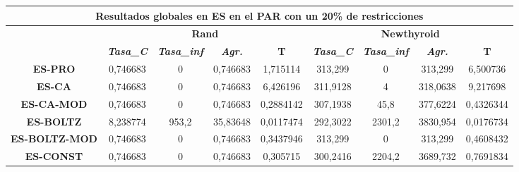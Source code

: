 \documentclass[12pt, spanish]{article}
\begin{document}
\begin{table}[H]
\hspace*{-1.2cm}\begin{tabular}{|c|c|c|c|c|c|c|c|c|}
\hline
\multicolumn{9}{|c|}{\textbf{Resultados globales en ES en el PAR con un 20\% de restricciones}}                                                                                                                                         \\ \hline
\multicolumn{1}{|l|}{\multirow{2}{*}{}} & \multicolumn{4}{c|}{\textbf{Rand}}                                                            & \multicolumn{4}{c|}{\textbf{Newthyroid}}                                                      \\ \cline{2-9} 
\multicolumn{1}{|l|}{}                  & \textit{\textbf{Tasa\_C}} & \textit{\textbf{Tasa\_inf}} & \textit{\textbf{Agr.}} & \textbf{T} & \textit{\textbf{Tasa\_C}} & \textit{\textbf{Tasa\_inf}} & \textit{\textbf{Agr.}} & \textbf{T} \\ \hline
\textbf{ES-PRO}                         & 0,746683                  & 0                           & 0,746683               & 1,715114   & 313,299                   & 0                           & 313,299                & 6,500736   \\ \hline
\textbf{ES-CA}                          & 0,746683                  & 0                           & 0,746683               & 6,426196   & 311,9128                  & 4                           & 318,0638               & 9,217698   \\ \hline
\textbf{ES-CA-MOD}                      & 0,746683                  & 0                           & 0,746683               & 0,2884142  & 307,1938                  & 45,8                        & 377,6224               & 0,4326344  \\ \hline
\textbf{ES-BOLTZ}                       & 8,238774                  & 953,2                       & 35,83648               & 0,0117474  & 292,3022                  & 2301,2                      & 3830,954               & 0,0176734  \\ \hline
\textbf{ES-BOLTZ-MOD}                   & 0,746683                  & 0                           & 0,746683               & 0,3437946  & 313,299                   & 0                           & 313,299                & 0,4608432  \\ \hline
\textbf{ES-CONST}                       & 0,746683                  & 0                           & 0,746683               & 0,305715   & 300,2416                  & 2204,2                      & 3689,732               & 0,7691834  \\ \hline
\end{tabular}
\end{table}
\end{document}
